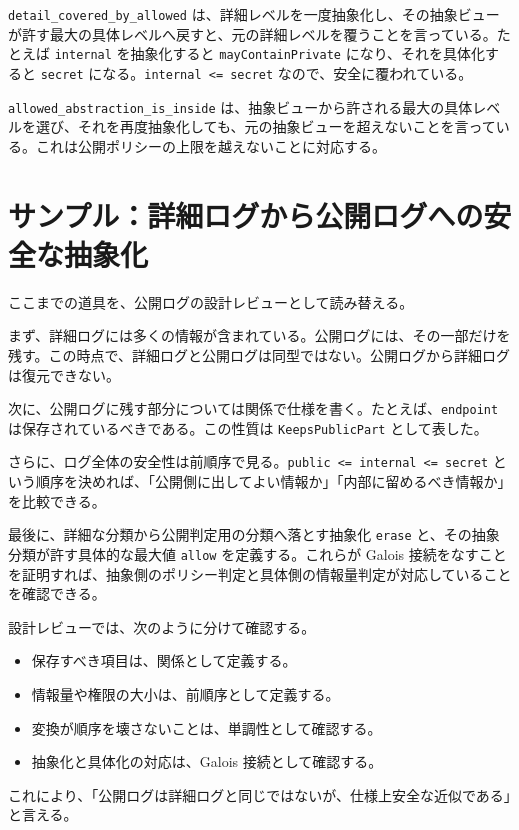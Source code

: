 \texttt{detail\_covered\_by\_allowed} は、詳細レベルを一度抽象化し、その抽象ビューが許す最大の具体レベルへ戻すと、元の詳細レベルを覆うことを言っている。たとえば \texttt{internal} を抽象化すると \texttt{mayContainPrivate} になり、それを具体化すると \texttt{secret} になる。\texttt{internal <= secret} なので、安全に覆われている。

\texttt{allowed\_abstraction\_is\_inside} は、抽象ビューから許される最大の具体レベルを選び、それを再度抽象化しても、元の抽象ビューを超えないことを言っている。これは公開ポリシーの上限を越えないことに対応する。

\section{サンプル：詳細ログから公開ログへの安全な抽象化}

ここまでの道具を、公開ログの設計レビューとして読み替える。

まず、詳細ログには多くの情報が含まれている。公開ログには、その一部だけを残す。この時点で、詳細ログと公開ログは同型ではない。公開ログから詳細ログは復元できない。

次に、公開ログに残す部分については関係で仕様を書く。たとえば、\texttt{endpoint} は保存されているべきである。この性質は \texttt{KeepsPublicPart} として表した。

さらに、ログ全体の安全性は前順序で見る。\texttt{public <= internal <= secret} という順序を決めれば、「公開側に出してよい情報か」「内部に留めるべき情報か」を比較できる。

最後に、詳細な分類から公開判定用の分類へ落とす抽象化 \texttt{erase} と、その抽象分類が許す具体的な最大値 \texttt{allow} を定義する。これらが Galois 接続をなすことを証明すれば、抽象側のポリシー判定と具体側の情報量判定が対応していることを確認できる。


\begin{softwarebox}
設計レビューでは、次のように分けて確認する。
\begin{itemize}
\item 保存すべき項目は、関係として定義する。
\item 情報量や権限の大小は、前順序として定義する。
\item 変換が順序を壊さないことは、単調性として確認する。
\item 抽象化と具体化の対応は、Galois 接続として確認する。
\end{itemize}
これにより、「公開ログは詳細ログと同じではないが、仕様上安全な近似である」と言える。
\end{softwarebox}

